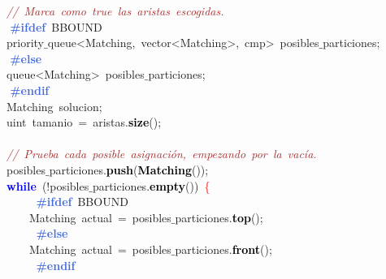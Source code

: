 \mbox{}\ \ \ \ \textit{\textcolor{Brown}{//\ Marca\ como\ true\ las\ aristas\ escogidas.}} \\
\mbox{}\textbf{\textcolor{RoyalBlue}{\ \ \ \ \#ifdef}}\ BBOUND \\
\mbox{}\ \ \ \ \textcolor{TealBlue}{priority$\_$queue\textless{}Matching,\ vector\textless{}Matching\textgreater{},\ cmp\textgreater{}}\ posibles$\_$particiones\textcolor{BrickRed}{;} \\
\mbox{}\textbf{\textcolor{RoyalBlue}{\ \ \ \ \#else}} \\
\mbox{}\ \ \ \ \textcolor{TealBlue}{queue\textless{}Matching\textgreater{}}\ posibles$\_$particiones\textcolor{BrickRed}{;} \\
\mbox{}\textbf{\textcolor{RoyalBlue}{\ \ \ \ \#endif}} \\
\mbox{}\ \ \ \ \textcolor{TealBlue}{Matching}\ solucion\textcolor{BrickRed}{;} \\
\mbox{}\ \ \ \ \textcolor{TealBlue}{uint}\ tamanio\ \textcolor{BrickRed}{=}\ aristas\textcolor{BrickRed}{.}\textbf{\textcolor{Black}{size}}\textcolor{BrickRed}{();} \\
\mbox{} \\
\mbox{}\ \ \ \ \textit{\textcolor{Brown}{//\ Prueba\ cada\ posible\ asignación,\ empezando\ por\ la\ vacía.}} \\
\mbox{}\ \ \ \ posibles$\_$particiones\textcolor{BrickRed}{.}\textbf{\textcolor{Black}{push}}\textcolor{BrickRed}{(}\textbf{\textcolor{Black}{Matching}}\textcolor{BrickRed}{());} \\
\mbox{}\ \ \ \ \textbf{\textcolor{Blue}{while}}\ \textcolor{BrickRed}{(!}posibles$\_$particiones\textcolor{BrickRed}{.}\textbf{\textcolor{Black}{empty}}\textcolor{BrickRed}{())}\ \textcolor{Red}{\{} \\
\mbox{}\textbf{\textcolor{RoyalBlue}{\ \ \ \ \ \ \ \ \#ifdef}}\ BBOUND \\
\mbox{}\ \ \ \ \ \ \ \ \textcolor{TealBlue}{Matching}\ actual\ \textcolor{BrickRed}{=}\ posibles$\_$particiones\textcolor{BrickRed}{.}\textbf{\textcolor{Black}{top}}\textcolor{BrickRed}{();} \\
\mbox{}\textbf{\textcolor{RoyalBlue}{\ \ \ \ \ \ \ \ \#else}} \\
\mbox{}\ \ \ \ \ \ \ \ \textcolor{TealBlue}{Matching}\ actual\ \textcolor{BrickRed}{=}\ posibles$\_$particiones\textcolor{BrickRed}{.}\textbf{\textcolor{Black}{front}}\textcolor{BrickRed}{();} \\
\mbox{}\textbf{\textcolor{RoyalBlue}{\ \ \ \ \ \ \ \ \#endif}} \\
